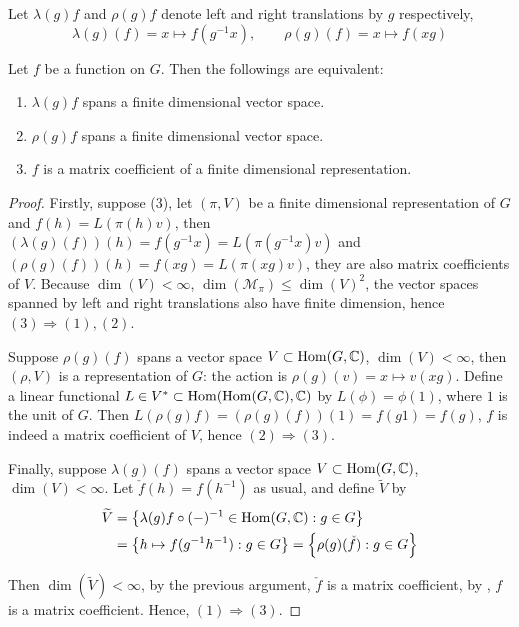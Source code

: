 Let $\lambda(g)f$ and $\rho(g)f$ denote left and right translations by $g$ respectively,
\begin{equation}
  \label{eq:LR-translation}
  \lambda(g)(f) = x \mapsto f(g^{-1}x),
  \qquad
  \rho(g)(f) = x \mapsto f(xg)
\end{equation}

\begin{thm} \label{left-right-finite}
  Let $f$ be a function on $G$. Then the followings are equivalent:
  \begin{enumerate}
    \item $\lambda(g)f$ spans a finite dimensional vector space.
    \item $\rho(g)f$ spans a finite dimensional vector space.
    \item $f$ is a matrix coefficient of a finite dimensional representation.
  \end{enumerate}
\end{thm}

\begin{proof}
  Firstly, suppose (3), let $(\pi,V)$ be a finite dimensional representation of
  $G$ and $f(h) = L(\pi(h)v)$, then $(\lambda(g)(f))(h) = f(g^{-1}x) =
  L(\pi(g^{-1}x)v)$ and $(\rho(g)(f))(h) = f(xg) = L(\pi(xg)v)$, they are also
  matrix coefficients of $V$.  Because $\dim(V) < \infty$,
  $\dim(\mathcal{M}_{\pi}) \leq \dim(V)^2$, the vector spaces spanned by left
  and right translations also have finite dimension, hence $(3) \Rightarrow
  (1),(2)$.

  Suppose $\rho(g)(f)$ spans a vector space $V \subset \operatorname{Hom}(G,\operatorname{\mathbb{C}})$, $\dim(V) <
  \infty$, then $(\rho,V)$ is a representation of $G$: the action is $\rho(g)(v)
  = x \mapsto v(xg)$.  Define a linear functional $L \in V^* \subset
  \operatorname{Hom}(\operatorname{Hom}(G,\operatorname{\mathbb{C}}),\operatorname{\mathbb{C}})$ by $L(\phi) = \phi(1)$, where $1$ is the unit of $G$.
  Then $L(\rho(g)f) = (\rho(g)(f))(1) = f(g1) = f(g)$, $f$ is indeed a matrix
  coefficient of $V$, hence $(2) \Rightarrow (3)$.
  
  Finally, suppose $\lambda(g)(f)$ spans a vector space $V \subset \operatorname{Hom}(G,\operatorname{\mathbb{C}})$,
  $\dim(V) < \infty$. Let $\check{f}(h) = f(h^{-1})$ as usual, and define
  $\widetilde{V}$ by
  \begin{align*}
    \widetilde{V} & = \left\{ \lambda(g)f \circ (-)^{-1} \in \operatorname{Hom}(G,\operatorname{\mathbb{C}}) : g \in G \right\}\\
    & = \left\{ h \mapsto f(g^{-1}h^{-1}) : g \in G \right\}
    = \left\{ \rho(g)(\check{f}) : g \in G \right\}
  \end{align*}

  Then $\dim(\widetilde{V}) < \infty$, by the previous argument, $\check{f}$ is
  a matrix coefficient, by , $f$ is a matrix coefficient.
  Hence, $(1) \Rightarrow (3)$.
\end{proof}

